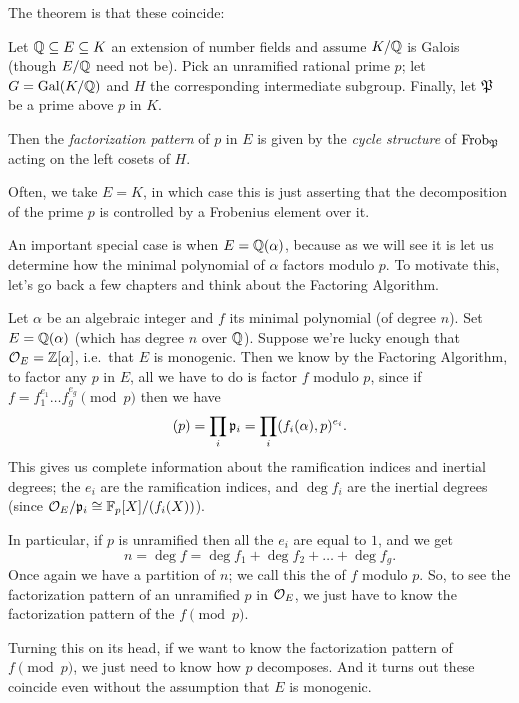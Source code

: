 The theorem is that these coincide:
\begin{theorem}
	\label{thm:frob_control_decomp}
	Let $\mathbb Q \subseteq E \subseteq K$ an extension of number fields
	and assume $K/\mathbb Q$ is Galois (though $E/\mathbb Q$ need not be).
	Pick an unramified rational prime $p$; let $G = \operatorname{Gal}(K/\mathbb Q)$
	and $H$ the corresponding intermediate subgroup.
	Finally, let $\mathfrak P$ be a prime above $p$ in $K$.

	Then the \emph{factorization pattern} of $p$ in $E$ is given by
	the \emph{cycle structure} of $\mathrm{Frob}_{\mathfrak P}$ acting on the left cosets of $H$.
\end{theorem}
Often, we take $E = K$, in which case this is just asserting
that the decomposition of the prime $p$ is controlled by a Frobenius element over it.

An important special case is when $E = \mathbb Q(\alpha)$,
because as we will see it is let us determine how the minimal
polynomial of $\alpha$ factors modulo $p$.
To motivate this, let's go back a few chapters
and think about the Factoring Algorithm.

Let $\alpha$ be an algebraic integer and $f$ its minimal polynomial (of degree $n$).
Set $E = \mathbb Q(\alpha)$ (which has degree $n$ over $\mathbb Q$).
Suppose we're lucky enough that $\mathcal O_E = \mathbb Z[\alpha]$,
i.e.\ that $E$ is monogenic.
Then we know by the Factoring Algorithm,
to factor any $p$ in $E$, all we have to do is factor $f$ modulo $p$,
since if $f = f_1^{e_1} \dots f_g^{e_g} \pmod p$ then we have
\[ (p) = \prod_i \mathfrak p_i = \prod_i (f_i(\alpha), p)^{e_i}. \]
This gives us complete information about the ramification indices and inertial degrees;
the $e_i$ are the ramification indices, and $\deg f_i$ are the inertial degrees
(since $\mathcal O_E / \mathfrak p_i \cong \mathbb F_p[X] / (f_i(X))$).

In particular, if $p$ is unramified then all the $e_i$ are equal to $1$, and we get
\[ n = \deg f = \deg f_1 + \deg f_2 + \dots + \deg f_g. \]
Once again we have a partition of $n$;
we call this the  of $f$ modulo $p$.
So, to see the factorization pattern of an unramified $p$ in $\mathcal O_E$,
we just have to know the factorization pattern of the $f \pmod p$.

Turning this on its head, if we want to know the factorization pattern of $f \pmod p$,
we just need to know how $p$ decomposes.
And it turns out these coincide even without the assumption that $E$ is monogenic.

